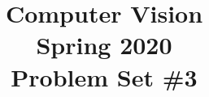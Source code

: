 \documentclass[aspectratio=169]{beamer}
\title{Computer Vision\\ 
	    Spring 2020 \\ 
	    Problem Set \#3}
\author{\yourInfo{}}
\date{}
\begin{document}
	
	\frame{\titlepage}
	
	
	
	
	
	
	
	
	
\end{document}

